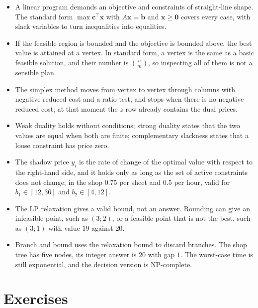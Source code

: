 \begin{ringkasan}
\begin{itemize}
  \item A linear program demands an objective and constraints of straight-line shape. The
        standard form $\max\mathbf{c}^{\top}\mathbf{x}$ with $A\mathbf{x}=\mathbf{b}$ and
        $\mathbf{x}\ge\mathbf{0}$ covers every case, with slack variables to turn inequalities
        into equalities.
  \item If the feasible region is bounded and the objective is bounded above, the best value is
        attained at a vertex. In standard form, a vertex is the same as a basic feasible
        solution, and their number is $\binom{n}{m}$, so inspecting all of them is not a
        sensible plan.
  \item The simplex method moves from vertex to vertex through columns with negative reduced
        cost and a ratio test, and stops when there is no negative reduced cost; at that moment
        the $z$ row already contains the dual prices.
  \item Weak duality holds without conditions; strong duality states that the two values are
        equal when both are finite; complementary slackness states that a loose constraint has
        price zero.
  \item The shadow price $y_{i}$ is the rate of change of the optimal value with respect to the
        right-hand side, and it holds only as long as the set of active constraints does not
        change; in the shop $0.75$ per sheet and $0.5$ per hour, valid for $b_{1}\in[12,36]$
        and $b_{2}\in[4,12]$.
  \item The LP relaxation gives a valid bound, not an answer. Rounding can give an infeasible
        point, such as $(3;2)$, or a feasible point that is not the best, such as $(3;1)$ with
        value $19$ against $20$.
  \item Branch and bound uses the relaxation bound to discard branches. The shop tree has five
        nodes, its integer answer is $20$ with gap $1$. The worst-case time is still
        exponential, and the decision version is NP-complete.
\end{itemize}
\end{ringkasan}

\section{Exercises}

